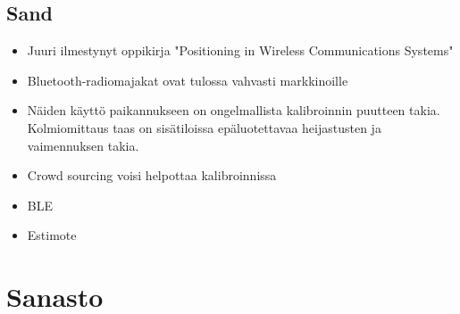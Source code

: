 \documentclass[a4paper]{scrartcl}
\begin{document}
\subsection{Sand\cite{sand2014positioning}}
\begin{itemize}
  \item Juuri ilmestynyt oppikirja "Positioning in Wireless Communications
    Systems"
\end{itemize}

\cite{zhu2012improving}

\begin{itemize}
	\item Bluetooth-radiomajakat ovat tulossa vahvasti markkinoille
	\item Näiden käyttö paikannukseen on ongelmallista kalibroinnin puutteen
		takia. Kolmiomittaus taas on sisätiloissa epäluotettavaa heijastusten
		ja vaimennuksen takia.
	\item Crowd sourcing voisi helpottaa kalibroinnissa
	\item BLE
	\item Estimote
\end{itemize}

\section{Sanasto}

\glsaddall
\printglossary
\glsaddall
\printglossary[type=\acronymtype,title=Lyhenteet]



\end{document}

